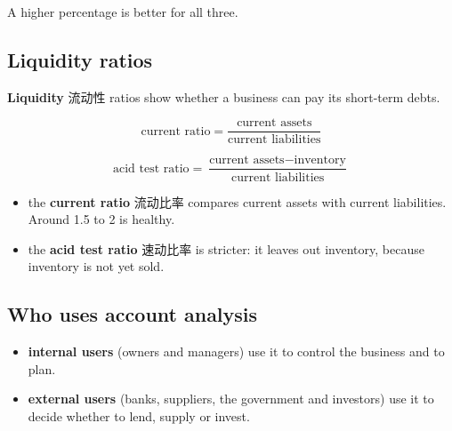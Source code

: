 \documentclass[11pt]{article}
\begin{document}
A higher percentage is better for all three.

\subsection*{Liquidity ratios}

\textbf{Liquidity} 流动性 ratios show whether a business can pay its short-term debts.

\[
\text{current ratio} = \frac{\text{current assets}}{\text{current liabilities}}
\]

\[
\text{acid test ratio} = \frac{\text{current assets} - \text{inventory}}{\text{current liabilities}}
\]

\begin{itemize}
\item the \textbf{current ratio} 流动比率 compares current assets with current liabilities. Around 1.5 to 2 is healthy.

\item the \textbf{acid test ratio} 速动比率 is stricter: it leaves out inventory, because inventory is not yet sold.

\end{itemize}

\subsection*{Who uses account analysis}

\begin{itemize}
\item \textbf{internal users} (owners and managers) use it to control the business and to plan.

\item \textbf{external users} (banks, suppliers, the government and investors) use it to decide whether to lend, supply or invest.

\end{itemize}
\end{document}
